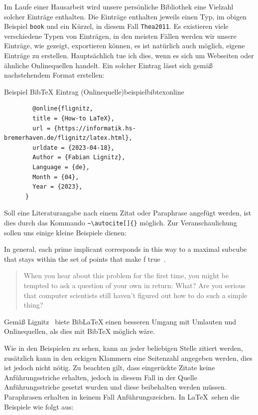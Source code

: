 Im Laufe einer Hausarbeit wird unsere persönliche Bibliothek eine Vielzahl
solcher Einträge enthalten. Die Einträge enthalten jeweils einen Typ, im obigen
Beispiel \texttt{book} und ein Kürzel, in diesem Fall \texttt{Thea2011}. Es 
existieren viele verschiedene Typen von Einträgen, in den meisten Fällen werden
wir unsere Einträge, wie gezeigt, exportieren können, es ist natürlich auch
möglich, eigene Einträge zu erstellen. Hauptsächlich tue ich dies, wenn es sich
um Webseiten oder ähnliche Onlinequellen handelt. 
Ein solcher Eintrag lässt sich gemäß nachstehendem Format erstellen: 

\begin{code}{Beispiel BibTeX Eintrag (Onlinequelle)}{beispielbibtexonline}
	\begin{verbatim}
		@online{flignitz,
		title = {How-to LaTeX},
		url = {https://informatik.hs-bremerhaven.de/flignitz/latex.html},
		urldate = {2023-04-18},
		Author = {Fabian Lignitz},
		Language = {de},
		Month = {04},
		Year = {2023},
	  }
	\end{verbatim}
\end{code}

Soll eine Literaturangabe nach einem Zitat oder Paraphrase angefügt werden, ist
dies durch das Kommando \texttt{\textasciitilde\textbackslash autocite[]\{\}}
möglich. Zur Veranschaulichung sollen uns einige kleine Beispiele dienen: 

\glqq In general, each prime implicant corresponds in this way to a maximal
subcube that stays within the set of points that make f
true~\autocite[]{KnutThea2009}.\grqq{}

\begin{quote}
	\footnotesize{	
	When you hear about this problem for the first time, you might be tempted
	to ask a question of your own in return: \glqq What? Are you serious that computer
	scientists still haven’t figured out how to do such a simple
	thing?\grqq{}~\autocite[S.432]{KnutThea2009}
	}
\end{quote}

Gemäß Lignitz~\autocite[]{flignitz} biete BibLaTeX einen besseren Umgang mit
Umlauten und Onlinequellen, als dies mit BibTeX möglich wäre.

Wie in den Beispielen zu sehen, kann an jeder beliebigen Stelle zitiert werden,
zusätzlich kann in den eckigen Klammern eine Seitenzahl angegeben werden, dies
ist jedoch nicht nötig. Zu beachten gilt, dass eingerückte Zitate keine
Anführungsstriche erhalten, jedoch in diesem Fall in der Quelle
Anführungsstriche gesetzt wurden und diese beibehalten werden müssen. Paraphrasen 
erhalten in keinem Fall Anführungszeichen. In \LaTeX~sehen die Beispiele wie folgt aus: 

